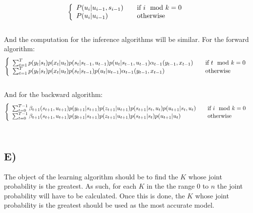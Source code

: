 \documentclass{report}
\begin{document}
\begin{equation}
  \left\{
  \begin{array}{l l}
    P(u_i | u_{i-1}, s_{i-1}) & \quad \text{if } i \mod k = 0 \\
    P(u_i | u_{i-1}) & \quad \text{otherwise}

  \end{array} \right.
\end{equation}\\
And the computation for the inference algorithms will be similar. For the forward
algorithm:
\begin{equation}
  \left\{
  \begin{array}{l l}
  \sum_{t = 1}^T p(y_t | s_t) p(x_t | u_t) p(s_t | s_{t-1}, u_{t-1}) p(u_t | s_{t-1}, u_{t-1}) \alpha_{t-1}(y_{t-1}, x_{t-1}) & \quad \text{if } t \mod k = 0 \\
  \sum_{t = 1}^T p(y_t | s_t) p(x_t | u_t) p(s_t | s_{t-1}) p(u_t | u_{t-1}) \alpha_{t-1}(y_{t-1}, x_{t-1}) & \quad \text{otherwise}

  \end{array} \right.
\end{equation}\\
And for the backward algorithm:
\begin{equation}
  \left\{
  \begin{array}{l l}
  \sum_{t=0}^{T-1} \beta_{t+1}(s_{t+1}, u_{t+1}) p(y_{t+1} | s_{t+1}) p(z_{t+1} | u_{t+1}) p(s_{t+1} | s_t, u_t) p(u_{t+1} | s_t, u_t) & \quad \text{if } i \mod k = 0 \\
  \sum_{t=0}^{T-1} \beta_{t+1}(s_{t+1}, u_{t+1}) p(y_{t+1} | s_{t+1}) p(z_{t+1} | u_{t+1}) p(s_{t+1} | s_t) p(u_{t+1} | u_t) & \quad \text{otherwise}

  \end{array} \right.
\end{equation}\\
\subsection*{E)}
The object of the learning algorithm should be to find the $K$ whose joint probability
is the greatest. As such, for each $K$ in the the range $0$ to $n$ the joint probability
will have to be calculated. Once this is done, the $K$ whose joint probability is the
greatest should be used as the most accurate model.
\end{document}
